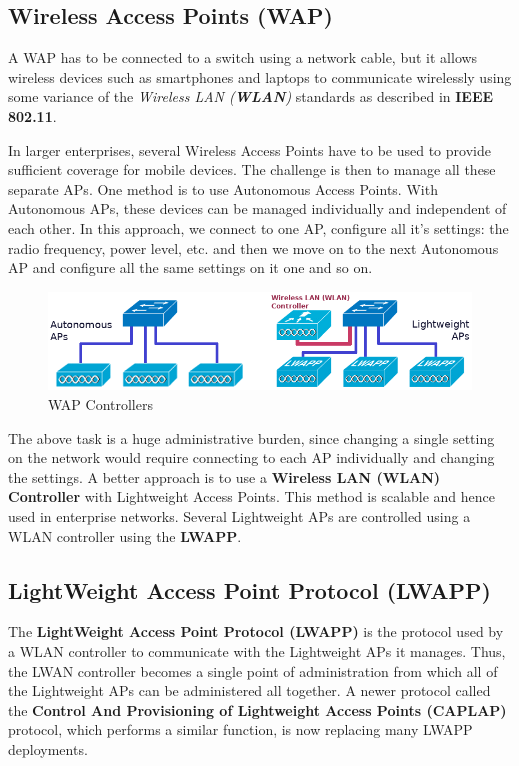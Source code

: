 \subsection{Wireless Access Points (WAP)}
A WAP has to be connected to a switch using a network cable, but it allows wireless devices such as smartphones and laptops to communicate wirelessly using some variance of the \textit{Wireless LAN (\textbf{WLAN})} standards as described in \textbf{IEEE 802.11}. 

In larger enterprises, several Wireless Access Points have to be used to provide sufficient coverage for mobile devices. The challenge is then to manage all these separate APs. One method is to use Autonomous Access Points. With Autonomous APs, these devices can be managed individually and independent of each other. In this approach, we connect to one AP, configure all it's settings: the radio frequency, power level, etc. and then we move on to the next Autonomous AP and configure all the same settings on it one and so on.

\begin{figure}[H]
	\centering
	\includegraphics[width=1\linewidth]{"Mod1/chapters/1.2.d WAPC"}
	\caption{WAP Controllers}
	\label{fig:wap_controllers}
\end{figure}
\vspace{-20pt}
\noindent
The above task is a huge administrative burden, since changing a single setting on the network would require connecting to each AP individually and changing the settings. A better approach is to use a \textbf{Wireless LAN (WLAN) Controller} with Lightweight Access Points. This method is scalable and hence used in enterprise networks. Several Lightweight APs are controlled using a WLAN controller using the \textbf{LWAPP}. 

\subsection{LightWeight Access Point Protocol (LWAPP)}
The \textbf{LightWeight Access Point Protocol (LWAPP)} is the protocol used by a WLAN controller to communicate with the Lightweight APs it manages. Thus, the LWAN controller becomes a single point of administration from which all of the Lightweight APs can be administered all together. A newer protocol called the \textbf{Control And Provisioning of Lightweight Access Points (CAPLAP)} protocol, which performs a similar function, is now replacing many LWAPP deployments.
